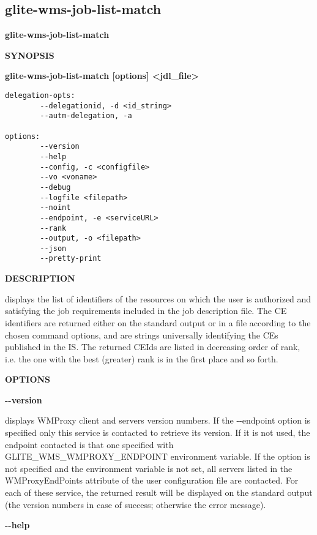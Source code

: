 
\subsection{glite-wms-job-list-match}
\label{glite-wms-job-list-match}

\medskip
\textbf{glite-wms-job-list-match}
\smallskip


\textbf{SYNOPSIS}
\smallskip

\textbf{glite-wms-job-list-match [options]  <jdl\_file>}

\begin{verbatim}
delegation-opts:
        --delegationid, -d <id_string>
        --autm-delegation, -a

options:
        --version
        --help
        --config, -c <configfile>
        --vo <voname>
        --debug
        --logfile <filepath>
        --noint
        --endpoint, -e <serviceURL>
        --rank
        --output, -o <filepath>
        --json
        --pretty-print
\end{verbatim}

\medskip
\textbf{DESCRIPTION}
\smallskip

displays the list of identifiers of the resources on which the user is authorized and
satisfying the job requirements included in the job description file. The CE identifiers are returned either
on the standard output or in a file according to the chosen command options, and are strings universally
identifying the CEs published in the IS.
The returned CEIds are listed in decreasing order of rank, i.e. the one with the best (greater) rank is in
the first place and so forth.


\medskip\textbf{OPTIONS}\smallskip



\textbf{-{}-version}

displays WMProxy client and servers version numbers.
If the -{}-endpoint option is specified only this service is contacted to retrieve its version. If it is not used, the endpoint contacted is that one specified with GLITE\_WMS\_WMPROXY\_ENDPOINT environment variable. If the option is not specified and the environment variable is not set, all servers listed in the WMProxyEndPoints attribute of the user configuration file are contacted. For each of these service, the returned result will be displayed on the standard output (the version numbers in case of success; otherwise the error message).




\textbf{-{}-help}


